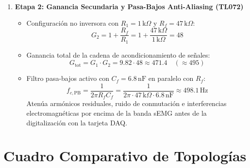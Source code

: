 \documentclass[11pt,a4paper]{article}
\begin{document}
\begin{enumerate}
    \item \textbf{Etapa 2: Ganancia Secundaria y Pasa-Bajos Anti-Aliasing (TL072)}
    \begin{itemize}
        \item Configuración no inversora con $R_1 = 1\,\text{k}\Omega$ y $R_f = 47\,\text{k}\Omega$:
        \begin{equation}
        G_2 = 1 + \frac{R_f}{R_1} = 1 + \frac{47\,\text{k}\Omega}{1\,\text{k}\Omega} = 48
        \end{equation}
        \item Ganancia total de la cadena de acondicionamiento de señales:
        \begin{equation}
        G_{\text{tot}} = G_1 \cdot G_2 = 9.82 \cdot 48 \approx 471.4 \quad (\approx 495)
        \end{equation}
        \item Filtro pasa-bajos activo con $C_f = 6.8\,\text{nF}$ en paralelo con $R_f$:
        \begin{equation}
        f_{c, \text{PB}} = \frac{1}{2\pi R_f C_f} = \frac{1}{2\pi \cdot 47\,\text{k}\Omega \cdot 6.8\,\text{nF}} \approx 498.1\,\text{Hz}
        \end{equation}
        Atenúa armónicos residuales, ruido de conmutación e interferencias electromagnéticas por encima de la banda sEMG antes de la digitalización con la tarjeta DAQ.
    \end{itemize}
\end{enumerate}

\section{Cuadro Comparativo de Topologías}
\end{document}
